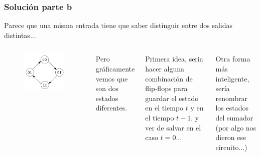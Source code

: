 \documentclass[10pt]{beamer}
\begin{document}
\begin{frame}
\frametitle{Solución parte b}

Parece que una misma entrada tiene que saber distinguir entre dos salidas distintas...
\pause
\vspace{0.5cm}

\begin{columns}
        \begin{figure}[h!]
            \centering
            \includegraphics[scale=0.2]{ej1.png}
        \end{figure}
        \pause
     Pero gráficamente vemos que son dos estados diferentes.
   \vspace{0.3cm}
\pause

Primera idea, seria hacer alguna combinación de flip-flops para guardar el estado en el tiempo $t$ y
en el tiempo $t-1$, y ver de salvar en el caso $t=0$...
   \vspace{0.3cm}
\pause

Otra forma m\'as inteligente, sería renombrar los estados del sumador (por algo nos dieron ese circuito...)

\end{columns}
\end{frame}
\end{document}
